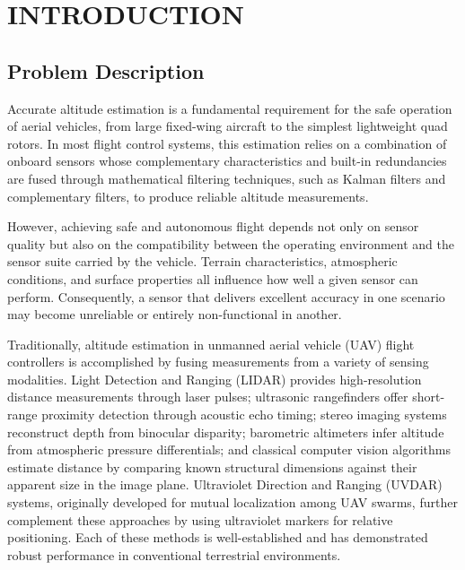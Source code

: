 \section{INTRODUCTION}

\subsection{Problem Description}

Accurate altitude estimation is a fundamental requirement for the safe operation of aerial vehicles, from large fixed-wing aircraft to the simplest lightweight quad rotors. In most flight control systems, this estimation relies on a combination of onboard sensors whose complementary characteristics and built-in redundancies are fused through mathematical filtering techniques, such as Kalman filters and complementary filters, to produce reliable altitude measurements.

However, achieving safe and autonomous flight depends not only on sensor quality but also on the compatibility between the operating environment and the sensor suite carried by the vehicle. Terrain characteristics, atmospheric conditions, and surface properties all influence how well a given sensor can perform. Consequently, a sensor that delivers excellent accuracy in one scenario may become unreliable or entirely non-functional in another.

Traditionally, altitude estimation in unmanned aerial vehicle (UAV) flight controllers is accomplished by fusing measurements from a variety of sensing modalities. Light Detection and Ranging (LIDAR) provides high-resolution distance measurements through laser pulses; ultrasonic rangefinders offer short-range proximity detection through acoustic echo timing; stereo imaging systems reconstruct depth from binocular disparity; barometric altimeters infer altitude from atmospheric pressure differentials; and classical computer vision algorithms estimate distance by comparing known structural dimensions against their apparent size in the image plane. Ultraviolet Direction and Ranging (UVDAR) systems, originally developed for mutual localization among UAV swarms, further complement these approaches by using ultraviolet markers for relative positioning. Each of these methods is well-established and has demonstrated robust performance in conventional terrestrial environments.

